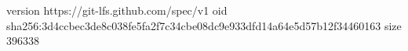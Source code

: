 version https://git-lfs.github.com/spec/v1
oid sha256:3d4ccbec3de8c038fe5fa2f7c34cbe08dc9e933dfd14a64e5d57b12f34460163
size 396338
